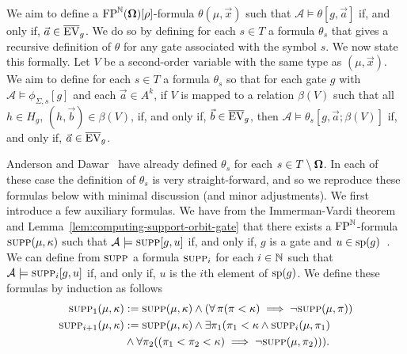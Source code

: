 \documentclass[../main/thesis.tex]{subfiles}
\begin{document}
We aim to define a $\text{\upshape FP}^{\mathbb{N}}(\mathbf{\mathbf{\Omega}})[\rho]$-formula $\theta(\mu, \vec{x})$ such
that $\mathcal{A} \models \theta[g, \vec{a}]$ if, and only if, $\vec{a} \in
\overline{\text{EV}}_g$. We do so by defining for each $s \in T$ a formula $\theta_s$
that gives a recursive definition of $\theta$ for any gate associated with the
symbol $s$. We now state this formally. Let $V$ be a second-order variable with
the same type as $(\mu, \vec{x})$. We aim to define for each $s \in T$ a formula
$\theta_s$ so that for each gate $g$ with $\mathcal{A} \models \phi_{\Sigma,
  s}[g]$ and each $\vec{a} \in A^k$, if $V$ is mapped to a relation $\beta(V)$
such that all $h \in H_g$, $(h, \vec{b}) \in \beta(V)$, if, and only if,
$\vec{b} \in \overline{\text{EV}}_g$, then $\mathcal{A} \models \theta_s [g, \vec{a};
\beta(V)]$ if, and only if, $\vec{a} \in \overline{\text{EV}}_g$.

Anderson and Dawar~\cite{AndersonD17} have already defined $\theta_s$ for each
$s \in T \setminus \mathbf{\mathbf{\Omega}}$. In each of these case the definition of $\theta_s$
is very straight-forward, and so we reproduce these formulas below with minimal
discussion (and minor adjustments). We first introduce a few auxiliary formulas.
We have from the Immerman-Vardi theorem and
Lemma~\ref{lem:computing-support-orbit-gate} that there exists a
$\text{\upshape FP}^{\mathbb{N}}$-formula $\textsc{supp}(\mu, \kappa)$ such that $\mathcal{A} \models
\textsc{supp} [g, u]$ if, and only if, $g$ is a gate and $u \in \text{sp}(g)$~\cite{AndersonD17}. We can
define from $\textsc{supp}$ a formula $\textsc{supp}_i$ for each $i \in \mathbb{N}$ such that
$\mathcal{A} \models \textsc{supp}_i[g, u]$ if, and only if, $u$ is the $i$th
element of $\text{sp}(g)$. We define these formulas by induction as follows
\begin{align*}
  \textsc{supp}_1(\mu, \kappa) &:= \textsc{supp}(\mu, \kappa) \land (\forall \, \pi (\pi < \kappa) \implies \neg \textsc{supp}(\mu, \pi)) \\
  \textsc{supp}_{i + 1} (\mu, \kappa) &:= \textsc{supp} (\mu, \kappa) \land \exists \pi_1 (\pi_1 < \kappa \land \textsc{supp}_i(\mu, \pi_1) \\
                           & \land \forall \pi_2 ((\pi_1 < \pi_2 < \kappa) \implies \neg \textsc{supp}(\mu, \pi_2))).
\end{align*}
\end{document}
